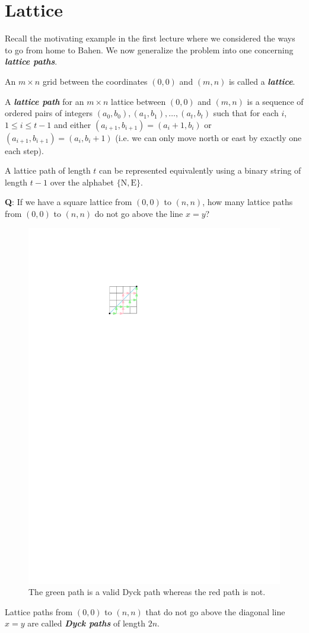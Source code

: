 \section{Lattice}

Recall the motivating example in the first lecture where we considered the ways to go from home to Bahen. We now generalize the problem into one concerning \textit{\textbf{lattice paths}}.

\begin{definition}[Lattice]
    An $m \times n$ grid between the coordinates $(0,0)$ and $(m,n)$ is called a \textit{\textbf{lattice}}.
\end{definition}

\begin{definition}
    A \textit{\textbf{lattice path}} for an $m \times n$ lattice between $(0,0)$ and $(m,n)$ is a sequence of ordered pairs of integers $(a_0,b_0),(a_1,b_1),\ldots,(a_t,b_t)$ such that for each $i$, $1 \leq i \leq t-1$ and either $(a_{i+1},b_{i+1}) = (a_i + 1, b_i)$ or $(a_{i+1},b_{i+1}) = (a_i, b_i + 1)$ (i.e. we can only move north or east by exactly one each step).
\end{definition}

A lattice path of length $t$ can be represented equivalently using a binary string of length $t-1$ over the alphabet $\{\mathrm{N,E}\}$.

\textbf{Q}: If we have a square lattice from $(0,0)$ to $(n,n)$, how many lattice paths from $(0,0)$ to $(n,n)$ do not go above the line $x=y$?

\begin{figure}[htbp]
    \centering
    \includegraphics[width=.2\linewidth]{figures/dyck-path.pdf}
    \caption{The green path is a valid Dyck path whereas the red path is not.}
    \label{fig:dyck-path}
\end{figure}

\begin{definition}
    Lattice paths from $(0,0)$ to $(n,n)$ that do not go above the diagonal line $x=y$ are called \textit{\textbf{Dyck paths}} of length $2n$.
\end{definition}

